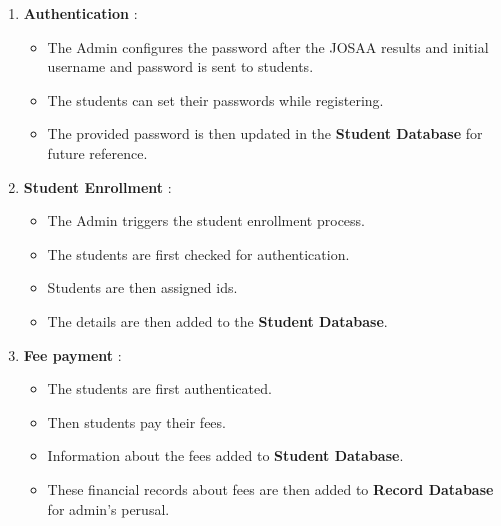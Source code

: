 \documentclass[12pt,a4paper]{article}
\begin{document}
\begin{enumerate}
	\item \textbf{Authentication} : 
		\begin{itemize}
			\item The Admin configures the password after the JOSAA results and initial username and password is sent to students.
			\item The students can set their passwords while registering.
			\item The provided password is then updated in the \textbf{Student Database} for future reference.
		\end{itemize}
	\item \textbf{Student Enrollment} :
		\begin{itemize}
			\item The Admin triggers the student enrollment process.
			\item The students are first checked for authentication.
			\item Students are then assigned ids.
			\item The details are then added to the \textbf{Student Database}.
		\end{itemize}
	\item \textbf{Fee payment} :
		\begin{itemize}
			\item The students are first authenticated.
			\item Then students pay their fees.
			\item Information about the fees added to \textbf{Student Database}.
			\item These financial records about fees are then added to \textbf{Record Database} for admin's perusal.
		\end{itemize}
	
\end{enumerate}
\end{document}
